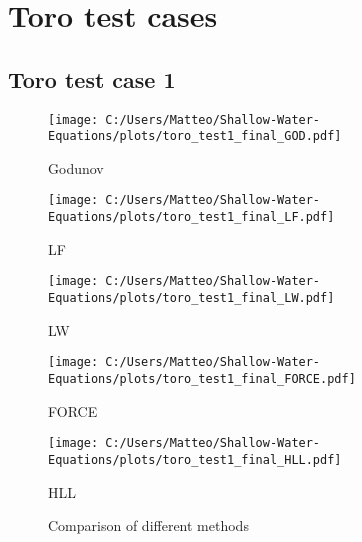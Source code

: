 \appendix
\section{Toro test cases}\label{app:toro_test_cases}

\subsection*{Toro test case 1}

\begin{figure}[H]
    \centering
    \begin{minipage}{0.45\textwidth}
        \centering
        \texttt{[image: C:/Users/Matteo/Shallow-Water-Equations/plots/toro\_test1\_final\_GOD.pdf]}
        \caption{Godunov}
    \end{minipage}%
    \hfill
    \begin{minipage}{0.45\textwidth}
        \centering
        \texttt{[image: C:/Users/Matteo/Shallow-Water-Equations/plots/toro\_test1\_final\_LF.pdf]}
        \caption{LF}
    \end{minipage}
    
    \vspace{0.5cm} %
    
    \begin{minipage}{0.45\textwidth}
        \centering
        \texttt{[image: C:/Users/Matteo/Shallow-Water-Equations/plots/toro\_test1\_final\_LW.pdf]}
        \caption{LW}
    \end{minipage}%
    \hfill
    \begin{minipage}{0.45\textwidth}
        \centering
        \texttt{[image: C:/Users/Matteo/Shallow-Water-Equations/plots/toro\_test1\_final\_FORCE.pdf]}
        \caption{FORCE}
    \end{minipage}

    \vspace{0.5cm} %
    
    \begin{minipage}{0.45\textwidth}
        \centering
        \texttt{[image: C:/Users/Matteo/Shallow-Water-Equations/plots/toro\_test1\_final\_HLL.pdf]}
        \caption{HLL}
    \end{minipage}
    \caption{Comparison of different methods}
\end{figure}


